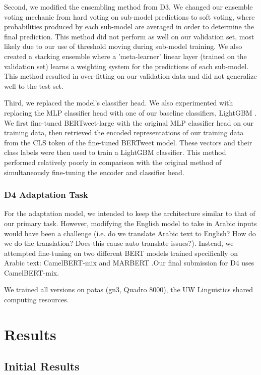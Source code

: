 \documentclass[11pt]{article}
\begin{document}
Second, we modified the ensembling method from D3. We changed our ensemble voting mechanic from hard voting on sub-model predictions to soft voting, where probabilities produced by each sub-model are averaged in order to determine the final prediction. This method did not perform as well on our validation set, most likely due to our use of threshold moving during sub-model training. We also created a stacking ensemble where a 'meta-learner' linear layer (trained on the validation set) learns a weighting system for the predictions of each sub-model. This method resulted in over-fitting on our validation data and did not generalize well to the test set.

Third, we replaced the model’s classifier head. We also experimented with replacing the MLP classifier head with one of our baseline classifiers, LightGBM \citealp{ke2017lightgbm}. We first fine-tuned BERTweet-large with the original MLP classifier head on our training data, then retrieved the encoded representations of our training data from the CLS token of the fine-tuned BERTweet model. These vectors and their class labels were then used to train a LightGBM classifier. This method performed relatively poorly in comparison with the original method of simultaneously fine-tuning the encoder and classifier head.

\subsubsection{D4 Adaptation Task}
For the adaptation model, we intended to keep the architecture similar to that of our primary task. However, modifying the English model to take in Arabic inputs would have been a challenge (i.e. do we translate Arabic text to English? How do we do the translation? Does this cause auto translate issues?). Instead, we attempted fine-tuning on two different BERT models trained specifically on Arabic text: CamelBERT-mix \citealp{inoue2021interplay} and MARBERT \citealp{DBLP:journals/corr/abs-2101-01785}.Our final submission for D4 uses CamelBERT-mix. 

We trained all versions on patas (gn3, Quadro 8000), the UW Linguistics shared computing resources. 


\section{Results}
\subsection{Initial Results}
\end{document}
